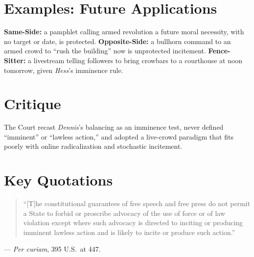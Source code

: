 \documentclass[12pt]{article}
\begin{document}
\section{Examples: Future Applications}
\textbf{Same-Side:} a pamphlet calling armed revolution a future moral necessity, with no target or date, is protected. \textbf{Opposite-Side:} a bullhorn command to an armed crowd to ``rush the building'' now is unprotected incitement. \textbf{Fence-Sitter:} a livestream telling followers to bring crowbars to a courthouse at noon tomorrow, given \textit{Hess}'s imminence rule.

\section{Critique}
The Court recast \textit{Dennis}'s balancing as an imminence test, never defined ``imminent'' or ``lawless action,'' and adopted a live-crowd paradigm that fits poorly with online radicalization and stochastic incitement.

\section{Key Quotations}
\begin{quote}
``[T]he constitutional guarantees of free speech and free press do not permit a State to forbid or proscribe advocacy of the use of force or of law violation except where such advocacy is directed to inciting or producing imminent lawless action and is likely to incite or produce such action.''
\end{quote}
\noindent --- \emph{Per curiam}, 395 U.S.\ at 447.
\end{document}
